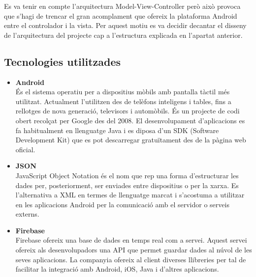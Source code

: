 Es va tenir en compte l'arquitectura Model-View-Controller però això provoca que s'hagi de trencar el gran acomplament que ofereix la plataforma Android entre el controlador i la vista. Per aquest motiu es va decidir decantar el disseny de l'arquitectura del projecte cap a l'estructura explicada en l'apartat anterior. 

\subsection{Tecnologies utilitzades}
\begin{itemize}
\item[]{\textbf{Android}}\\
És el sistema operatiu per a dispositius mòbils amb pantalla tàctil més utilitzat. Actualment l'utilitzen des de telèfons inteligens i tables, fins a rellotges de nova generació, televisors i automòbils. És un projecte de codi obert recolçat per Google des del 2008. El desenvolupament d'aplicacions es fa habitualment en llenguatge Java i es diposa d'un SDK (Software Development Kit) que es pot descarregar gratuïtament des de la pàgina web oficial.\\

\item[]{\textbf{JSON}}\\
JavaScript Object Notation és el nom que rep una forma d'estructurar les dades per, posteriorment, ser enviades entre dispositius o per la xarxa. Es l'alternativa a XML en termes de llenguatge marcat i s'acostuma a utilitzar en les aplicacions Android per la comunicació amb el servidor o serveis externs.\\

\item[]{\textbf{Firebase}}\\
Firebase ofereix una base de dades en temps real com a servei. Aquest servei ofereix als desenvolupadors una API que permet guardar dades al núvol de les seves aplicacions. La companyia ofereix al client diverses llibreries per tal de facilitar la integració amb Android, iOS, Java i d'altres aplicacions.

\end{itemize}

\clearpage

